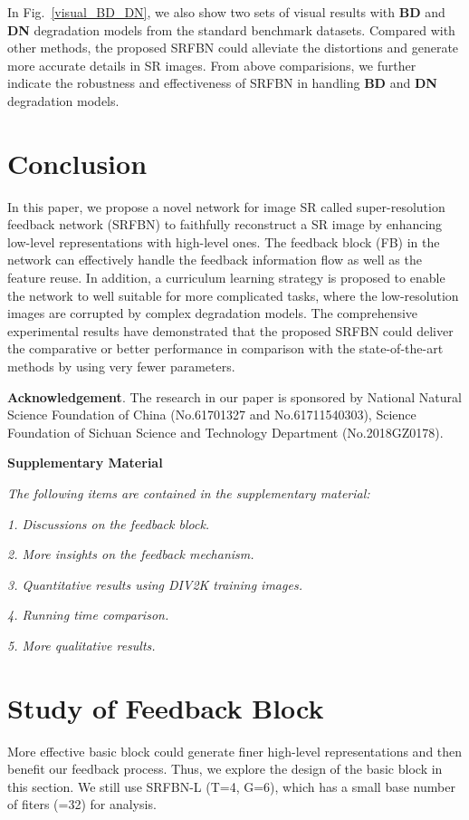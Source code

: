 \documentclass[10pt,twocolumn,letterpaper]{article}
\begin{document}
	In Fig.~\ref{visual_BD_DN}, we also show two sets of visual results with \textbf{BD} and \textbf{DN} degradation models from the standard benchmark datasets. Compared with other methods, the proposed SRFBN could alleviate the distortions and generate more accurate details in SR images. From above comparisions, we further indicate the robustness and effectiveness of SRFBN in handling \textbf{BD} and \textbf{DN} degradation models. 

	\section{Conclusion}
	In this paper, we propose a novel network for image SR called super-resolution feedback network (SRFBN) to faithfully reconstruct a SR image by enhancing low-level representations with high-level ones. The feedback block (FB) in the network can effectively handle the feedback information flow as well as the feature reuse. In addition, a curriculum learning strategy is proposed to enable the network to well suitable for more complicated tasks, where the low-resolution images are corrupted by complex degradation models. The comprehensive experimental results have demonstrated that the proposed SRFBN could deliver the comparative or better performance in comparison with the state-of-the-art methods by using very fewer parameters. 
	\newline
	
	\noindent\textbf{Acknowledgement}. The research in our paper is sponsored by National Natural Science Foundation of China (No.61701327 and No.61711540303), Science Foundation of Sichuan Science and Technology Department (No.2018GZ0178).
	\clearpage
	{\small
		
		
	}

\clearpage
\appendix
\noindent\textbf{\large{Supplementary Material}} 

\vspace{0.3cm}
\textit{The following items are contained in the supplementary material:}

\textit{1. Discussions on the feedback block.}

\textit{2. More insights on the feedback mechanism.}

\textit{3. Quantitative results using DIV2K training images.}

\textit{4. Running time comparison.}

\textit{5. More qualitative results.}


\section{Study of Feedback Block}
More effective basic block could generate finer high-level representations and then benefit our feedback process. Thus, we explore the design of the basic block in this section. We still use SRFBN-L (T=4, G=6), which has a small base number of fiters (=32) for analysis. 
\end{document}
